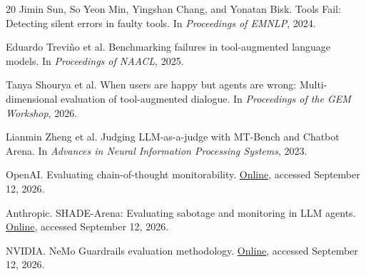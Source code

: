\documentclass[runningheads]{llncs}
\begin{document}
\begin{thebibliography}{20}
Jimin Sun, So Yeon Min, Yingshan Chang, and Yonatan Bisk.
\newblock Tools Fail: Detecting silent errors in faulty tools.
\newblock In \emph{Proceedings of EMNLP}, 2024.

Eduardo Trevi{\~n}o et al.
\newblock Benchmarking failures in tool-augmented language models.
\newblock In \emph{Proceedings of NAACL}, 2025.

Tanya Shourya et al.
\newblock When users are happy but agents are wrong: Multi-dimensional
evaluation of tool-augmented dialogue.
\newblock In \emph{Proceedings of the GEM Workshop}, 2026.

Lianmin Zheng et al.
\newblock Judging LLM-as-a-judge with MT-Bench and Chatbot Arena.
\newblock In \emph{Advances in Neural Information Processing Systems}, 2023.

OpenAI.
\newblock Evaluating chain-of-thought monitorability.
\newblock \href{https://alignment.openai.com/monitorability-evals/}{Online},
accessed September 12, 2026.

Anthropic.
\newblock SHADE-Arena: Evaluating sabotage and monitoring in LLM agents.
\newblock
\href{https://www.anthropic.com/research/shade-arena-sabotage-monitoring}{Online},
accessed September 12, 2026.

NVIDIA.
\newblock NeMo Guardrails evaluation methodology.
\newblock
\href{https://docs.nvidia.com/nemo/guardrails/evaluation/evaluation-methodology}{Online},
accessed September 12, 2026.

\end{thebibliography}
\end{document}
